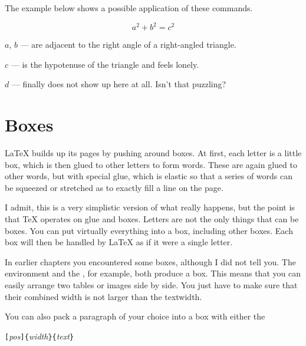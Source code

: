 \noindent The example below shows a possible application of these commands.

\begin{example}[examplewidth=0.45\linewidth]
\newenvironment{vardesc}[1]{%
  \settowidth{\parindent}{#1:\ }
  \makebox[0pt][r]{#1:\ }}{}

\begin{displaymath}
a^2+b^2=c^2
\end{displaymath}

\begin{vardesc}{Where}\(a\),
\(b\) --- are adjacent to the right
angle of a right-angled triangle.

\(c\) --- is the hypotenuse of
the triangle and feels lonely.

\(d\) --- finally does not show up
here at all. Isn't that puzzling?
\end{vardesc}
\end{example}

\section{Boxes}\label{sec:boxes}
\LaTeX{} builds up its pages by pushing around boxes. At first, each
letter is a little box, which is then glued to other letters to form
words. These are again glued to other words, but with special glue,
which is elastic so that a series of words can be squeezed or
stretched as to exactly fill a line on the page.

I admit, this is a very simplistic version of what really happens, but the
point is that \TeX{} operates on glue and boxes. Letters are not the only
things that can be boxes. You can put virtually everything into a box,
including other boxes. Each box will then be handled by \LaTeX{} as if it
were a single letter.

In earlier chapters you encountered some boxes, although I did
not tell you. The  environment and the , for
example, both produce a box. This means that you can easily arrange two
tables or images side by side. You just have to make sure that their
combined width is not larger than the textwidth.

You can also pack a paragraph of your choice into a box with either
the

\begin{lscommand}
  \verb|[|\emph{pos}\verb|]{|\emph{width}\verb|}{|\emph{text}\verb|}|
\end{lscommand}

